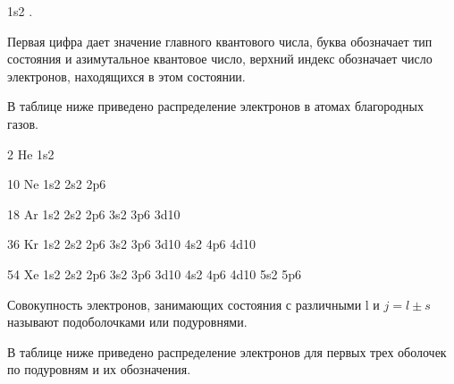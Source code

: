 \documentclass[a4paper,14pt, openany, twoside, draft]{extbook} %
\begin{document}
1s2 .

Первая цифра дает значение главного квантового числа, буква обозначает тип состояния и азимутальное квантовое число, верхний индекс обозначает число электронов, находящихся в этом состоянии.

В таблице ниже приведено распределение электронов в атомах благородных газов.

 2 He  1s2

10 Ne  1s2  2s2  2p6

18 Ar  1s2  2s2  2p6  3s2  3p6  3d10

36 Kr  1s2  2s2  2p6  3s2  3p6  3d10  4s2 4p6  4d10

54 Xe  1s2  2s2  2p6  3s2  3p6  3d10  4s2 4p6  4d10  5s2  5p6

Совокупность электронов, занимающих состояния с различными l и   $j=l\pm s$ называют подоболочками или подуровнями.

В таблице ниже приведено распределение электронов для первых трех оболочек по подуровням и их обозначения.
\end{document}
